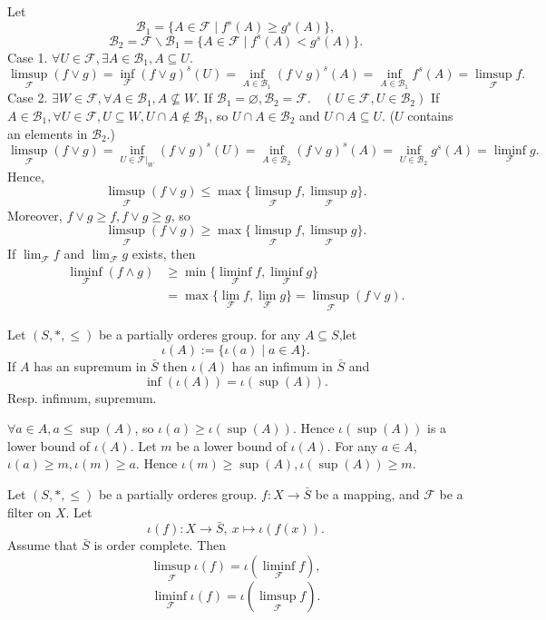 \begin{proofenv}
    Let $$\mathcal{B}_1=\{A\in \mathcal{F}\mid f^s(A)\ge g^s(A)\},$$
    $$\mathcal{B}_2=\mathcal{F}\backslash\mathcal{B}_1=\{A\in\mathcal{F}\mid f^s(A)<g^s(A)\}.$$
    Case 1. $\forall U\in \mathcal{F},\exists A\in \mathcal{B}_1, A\subseteq U$.
    $$\limsup_\mathcal{F}(f\vee g)=\inf_{\mathcal{F}}(f\vee g)^s(U)=\inf_{A\in \mathcal{B}_1}(f\vee g)^s(A)=\inf _{A\in \mathcal{B}_1}f^s(A)=\limsup_{\mathcal{F}}f.$$
    Case 2. $\exists W\in \mathcal{F}, \forall A\in \mathcal{B}_1,A\nsubseteq  W$. If $\mathcal{B}_1=\varnothing, \mathcal{B}_2=\mathcal{F}.\quad (U\in \mathcal{F},U\in\mathcal{B}_2)$ If $A\in \mathcal{B}_1, \forall U\in \mathcal{F}, U\subseteq W, U\cap A\notin \mathcal{B}_1 $, so $U\cap A\in \mathcal{B}_2$ and $U\cap A\subseteq U$. ($U$ contains an elements in $\mathcal{B}_2$.)
    $$\limsup_{\mathcal{F}}(f\vee g)=\inf _{U\in \mathcal{F}|_W}(f\vee g)^s(U)=\inf_{A\in \mathcal{B}_2}(f\vee g)^s(A)=\inf_{U\in \mathcal{B}_2}g^s(A)=\liminf_{\mathcal{F}}g.$$
    Hence,
    $$\limsup_{\mathcal{F}}(f\vee g)\le \max\{\limsup_{\mathcal{F}}f,\limsup_{\mathcal{F}}g\}.$$
    Moreover, $f\vee g\ge f, f\vee g\ge g$, so
    $$\limsup_{\mathcal{F}}(f\vee g)\ge \max\{\limsup_{\mathcal{F}}f,\limsup_{\mathcal{F}}g\}.$$
    If $\lim_{\mathcal{F}}f$ and $\lim_{\mathcal{F}}g$ exists, then
    \begin{align*}
        \liminf_{\mathcal{F}}(f\wedge g)&\ge \min\{\liminf_{\mathcal{F}}f,\liminf_{\mathcal{F}}g\}\\
        &=\max\{\lim_\mathcal{F} f,\lim_\mathcal{F} g\}=\limsup_{\mathcal{F}}(f\vee g).
    \end{align*}
\end{proofenv}
\begin{propositionenv}
    Let $(S,*,\le)$ be a partially orderes group. for any $A\subseteq S$,let 
    $$\iota(A):=\{\iota(a)\mid a\in A\}.$$
    If $A$ has an supremum in $\bar{S}$ then $\iota(A)$ has an infimum in $\bar{S}$ and
    $$\inf(\iota(A))=\iota(\sup(A)).$$
    Resp. infimum, supremum.
\end{propositionenv}
\begin{proofenv}
    \quad \newline
    $\forall a\in A, a\le \sup (A)$, so $\iota(a)\ge \iota(\sup(A))$. Hence $\iota(\sup(A))$ is a lower bound of $\iota(A)$. Let $m$ be a lower bound of $\iota(A)$. For any $a\in A$, $\iota(a)\ge m, \iota(m)\ge a$. Hence $\iota(m)\ge \sup(A),\iota(\sup(A))\ge m$. 
\end{proofenv}
\begin{corollaryenv}
    Let $(S,*,\le)$ be a partially orderes group. $f:X\longrightarrow \bar{S}$ be a mapping, and $\mathcal{F}$ be a filter on $X$. Let $$\iota(f):X\longrightarrow \bar{S},\ x\longmapsto \iota(f(x)).$$
    Assume that $\bar{S}$ is order complete. Then 
    $$\limsup_{\mathcal{F}}\iota(f)=\iota(\liminf_{\mathcal{F}}f),$$
    $$\liminf_{\mathcal{F}}\iota(f)=\iota(\limsup_{\mathcal{F}}f).$$
\end{corollaryenv}
